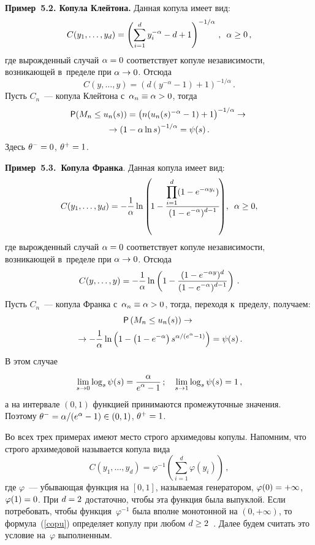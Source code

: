 \begin{multicols}{2}
\smallskip

\noindent
\textbf{Пример~5.2. Копула Клейтона.} Данная копула имеет вид:
$$
C(y_1,\dots,y_d)=\left(\sum\limits_{i=1}^d y_i^{-\alpha}-d+1\right)^{-1/\alpha}\,,
\enskip \alpha\ge 0\,,
$$
где вырожденный случай $\alpha\hm=0$ соответствует копуле независимости,
возникающей в~пределе при $\alpha\hm\to 0$. Отсюда
$$
C(y,\dots,y)=\left(d (y^{-\alpha}-1)+1\right)^{-1/\alpha}\,.
$$
Пусть $C_n$~--- копула Клейтона с~$\alpha_n\hm\equiv \alpha>0$, тогда
\begin{multline*}
{\sf P}(M_n\le u_n(s))=\left(n(u_n(s)^{-\alpha}-1)+1\right)^{-1/\alpha}\to{}\\
\to \left(1-\alpha\ln s\right)^{-1/\alpha}=\psi(s)\,.
\end{multline*}
Здесь $\theta^-\hm=0$, $\theta^+\hm=1$.

\smallskip

\noindent
\textbf{Пример~5.3.\ Копула Франка}. Данная копула имеет вид:
$$
C(y_1,\dots,y_d)=-\displaystyle\frac{\displaystyle 1\mathstrut}{\displaystyle \alpha\mathstrut}\ln\left(\!1-\displaystyle\frac{\displaystyle \prod_{i=1}^d(1-e^{-\alpha y_i})\mathstrut}{\displaystyle (1-e^{-\alpha})^{d-1}\mathstrut}\!\right)\!,
\enskip \alpha\ge 0,
$$
где вырожденный случай $\alpha\hm=0$ соответствует копуле независимости,
возникающей в~пределе при $\alpha\hm\to 0$. Отсюда
$$
C(y,\dots,y)=-\displaystyle\frac{\displaystyle 1\mathstrut}{\displaystyle \alpha\mathstrut}\ln\left(1-
\displaystyle\frac{\displaystyle (1-e^{-\alpha y})^d\mathstrut}{\displaystyle (1-e^{-\alpha})^{d-1}\mathstrut}\right)\,.
$$
Пусть $C_n$~--- копула Франка с~$\alpha_n\hm\equiv \alpha\hm>0$,
тогда, переходя к~пределу, получаем:
\begin{multline*}
{\sf P}\left(M_n\le u_n(s)\right)\to{}\\
{}\to -
\displaystyle\frac{\displaystyle 1\mathstrut}{\displaystyle \alpha\mathstrut}\ln\left(1-\left(1-e^{-\alpha}\right)s^{\alpha/(e^\alpha-1)}\right)
=\psi(s)\,.
\end{multline*}
В этом случае
$$
\lim\limits_{s\to 0}\log_s\psi(s)=
\displaystyle\frac{\displaystyle \alpha\mathstrut}{\displaystyle e^\alpha-1\mathstrut}\,;\quad \lim\limits_{s\to 1}\log_s\psi(s)=1\,,
$$
а на интервале $(0,1)$ функцией принимаются промежуточные значения. Поэтому
$\theta^-\hm=\alpha/(e^\alpha-1)\hm\in (0,1)$, $\theta^+\hm=1$.

Во всех трех примерах имеют место строго архимедовы копулы.
Напомним, что строго архимедовой называется копула вида
\begin{equation}\label{copu}
C(y_1,\dots,y_d)=\varphi^{-1}\left(\sum\limits_{i=1}^d \varphi(y_i)\right)\,,
\end{equation}
где $\varphi$~--- убывающая функция на $[0,1]$, называемая генератором,
$\varphi(0)\hm=+\infty$, $\varphi(1)\hm=0$.
При $d\hm=2$ достаточно, чтобы эта функция была выпуклой. Если потребовать,
чтобы функция~$\varphi^{-1}$
была вполне монотонной на $(0,+\infty)$, то формула~(\ref{copu})
определяет копулу при любом $d\hm\ge 2$~\cite[теорема 4.6.2]{Nel}.
Далее будем считать это условие на~$\varphi$ выполненным.


\end{multicols}
